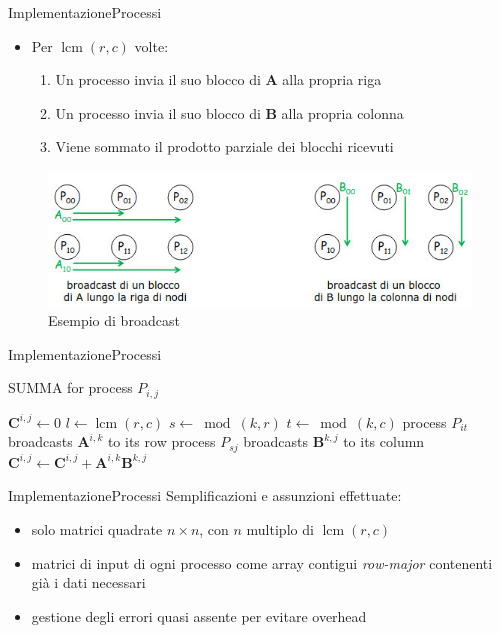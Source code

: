 \documentclass{beamer}
\DeclareMathOperator{\lcm}{lcm}
\begin{document}
\begin{frame}{Implementazione}{Processi}
    \begin{itemize}
        \item Per $\lcm(r,c)$ volte:
              \begin{enumerate}
                  \item Un processo invia il suo blocco di $\mathbf{A}$ alla propria riga
                  \item Un processo invia il suo blocco di $\mathbf{B}$ alla propria colonna
                  \item Viene sommato il prodotto parziale dei blocchi ricevuti
              \end{enumerate}
    \end{itemize}
    \begin{figure}
        \includegraphics[width=0.5\linewidth]{imgs/broadcast_1.jpg}
        \caption{Esempio di broadcast}
    \end{figure}
\end{frame}

\begin{frame}{Implementazione}{Processi}
    \begin{algorithm}[H]
        \caption{SUMMA for process $P_{i,j}$}
        \begin{algorithmic}[1]
            \State $\mathbf{C}^{i,j} \gets 0$
            \State $l \gets \lcm(r,c)$
            \State $s \gets \bmod(k, r)$
            \State $t \gets \bmod(k, c)$
            \State process $P_{it}$ broadcasts $\mathbf{A}^{i,k}$ to its row
            \State process $P_{sj}$ broadcasts $\mathbf{B}^{k,j}$ to its column
            \State $\mathbf{C}^{i,j} \gets \mathbf{C}^{i,j} + \mathbf{A}^{i,k}\mathbf{B}^{k,j}$
            \EndFor
        \end{algorithmic}
    \end{algorithm}
\end{frame}

\begin{frame}{Implementazione}{Processi}
    Semplificazioni e assunzioni effettuate:
    \begin{itemize}
        \item solo matrici quadrate $n \times n$, con $n$ multiplo di $\lcm(r,c)$
        \item matrici di input di ogni processo come array contigui \textit{row-major} contenenti già i dati necessari
        \item gestione degli errori quasi assente per evitare overhead
    \end{itemize}
\end{frame}
\end{document}
